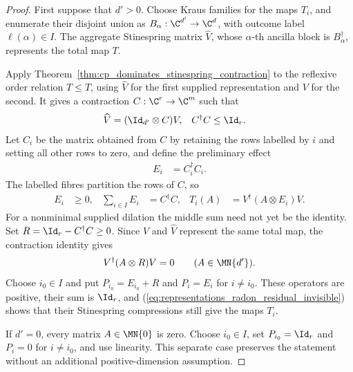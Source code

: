 \begin{proof}\leanok
    First suppose that $d'>0$. Choose Kraus families for the maps $T_i$, and
    enumerate their disjoint union as
    $B_\alpha:\C^{d'}\to\C^d$, with outcome label $\ell(\alpha)\in I$.
    The aggregate Stinespring matrix $\widehat V$, whose $\alpha$-th ancilla
    block is $B_\alpha^\dagger$, represents the total map $T$.

    Apply Theorem~\ref{thm:cp_dominates_stinespring_contraction} to the
    reflexive order relation $T\le T$, using $\widehat V$ for the first
    supplied representation and $V$ for the second. It gives a contraction
    $C:\C^r\to\C^m$ such that
    \begin{align}
        \widehat V
        &=(\Id_{d'}\otimes C)V,
        & C^\dagger C&\leq\Id_r.
        \notag
    \end{align}
    Let $C_i$ be the matrix obtained from $C$ by retaining the rows labelled
    by $i$ and setting all other rows to zero, and define the preliminary
    effect
    \begin{align}
        E_i
        &=C_i^\dagger C_i.
        \label{eq:representations_radon_effects}
    \end{align}
    The labelled fibres partition the rows of $C$, so
    \begin{align}
        E_i&\geq0,
        & \sum_{i\in I}E_i&=C^\dagger C,
        & T_i(A)&=V^\dagger(A\otimes E_i)V.
        \label{eq:representations_radon_preliminary_effects}
    \end{align}
    For a nonminimal supplied dilation the middle sum need not yet be the
    identity. Set
    $R=\Id_r-C^\dagger C\geq0$. Since $V$ and $\widehat V$ represent the
    same total map, the contraction identity gives
    \begin{align}
        V^\dagger(A\otimes R)V=0
        \qquad(A\in\MN{d'}).
        \label{eq:representations_radon_residual_invisible}
    \end{align}
    Choose $i_0\in I$ and put
    $P_{i_0}=E_{i_0}+R$ and $P_i=E_i$ for $i\ne i_0$. These operators are
    positive, their sum is $\Id_r$, and
    (\ref{eq:representations_radon_residual_invisible}) shows that their
    Stinespring compressions still give the maps $T_i$.

    If $d'=0$, every matrix $A\in\MN{0}$ is zero. Choose $i_0\in I$, set
    $P_{i_0}=\Id_r$ and $P_i=0$ for $i\ne i_0$, and use linearity. This
    separate case preserves the statement without an additional
    positive-dimension assumption.
\end{proof}

